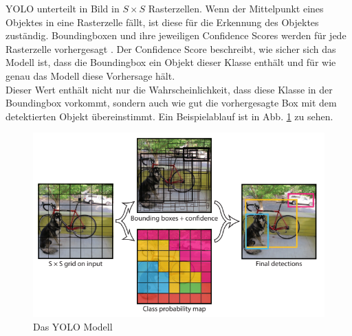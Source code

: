 {	YOLO unterteilt in Bild in $S \times S $ Rasterzellen. Wenn der Mittelpunkt eines Objektes in eine Rasterzelle fällt, ist diese für die Erkennung des Objektes zuständig. Boundingboxen und ihre jeweiligen Confidence Scores werden für jede Rasterzelle vorhergesagt \citep{Redmon2016}.
	Der Confidence Score beschreibt, wie sicher sich das Modell ist, dass die Boundingbox ein Objekt dieser Klasse enthält und für wie genau das Modell diese Vorhersage hält. \\
	Dieser Wert enthält nicht nur die Wahrscheinlichkeit, dass diese Klasse in der Boundingbox vorkommt, sondern auch wie gut die vorhergesagte Box mit dem detektierten Objekt übereinstimmt. Ein Beispielablauf ist in Abb. \ref{YOLO_Model} zu sehen.
	\begin{figure}[ht]
		\centering
		\includegraphics*[scale = 2, keepaspectratio, trim=2 2 2 2 ]{images/YOLO/YOLO_model.png}
		\caption[Das YOLO Modell]{Das YOLO Modell\citep{Redmon2016}}
		\label{YOLO_Model}
 	\end{figure}

	


}
